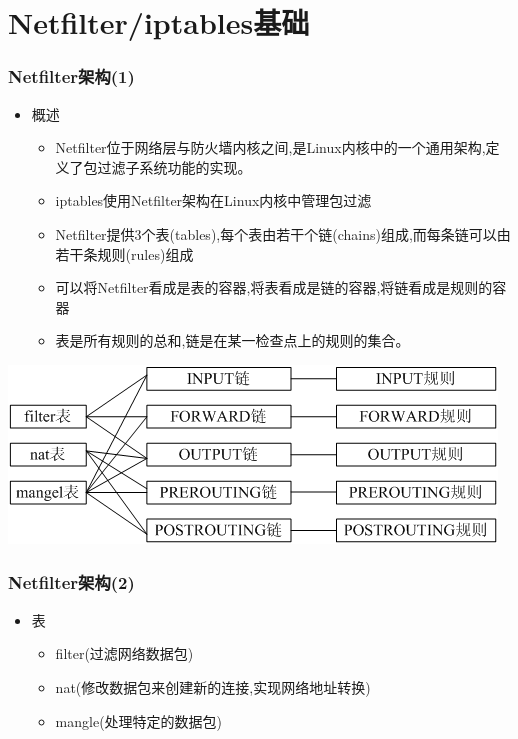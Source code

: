 \documentclass[xcolor=svgnames,presentation]{beamer}
\begin{document}
\section{Netfilter/iptables基础}
\label{sec-2}
\begin{frame}
\frametitle{Netfilter架构(1)}
\label{sec-2-1}
\begin{itemize}

\item 概述
\label{sec-2-1-1}%
\begin{itemize}

\item Netfilter位于网络层与防火墙内核之间,是Linux内核中的一个通用架构,定义了包过滤子系统功能的实现。
\label{sec-2-1-1-1}%

\item iptables使用Netfilter架构在Linux内核中管理包过滤
\label{sec-2-1-1-2}%

\item Netfilter提供3个表(tables),每个表由若干个链(chains)组成,而每条链可以由若干条规则(rules)组成
\label{sec-2-1-1-3}%

\item 可以将Netfilter看成是表的容器,将表看成是链的容器,将链看成是规则的容器
\label{sec-2-1-1-4}%

\item 表是所有规则的总和,链是在某一检查点上的规则的集合。
\label{sec-2-1-1-5}%
\end{itemize} %
\end{itemize} %
\label{sec-2-1-2}

\includegraphics[width=.9\linewidth]{img/iptables1.png}
\end{frame}
\begin{frame}
\frametitle{Netfilter架构(2)}
\label{sec-2-2}
\begin{itemize}

\item 表
\label{sec-2-2-1}%
\begin{itemize}

\item filter(过滤网络数据包)
\label{sec-2-2-1-1}%

\item nat(修改数据包来创建新的连接,实现网络地址转换)
\label{sec-2-2-1-2}%

\item mangle(处理特定的数据包)
\label{sec-2-2-1-3}%
\end{itemize} %
\end{itemize} %
\end{frame}
\end{document}
